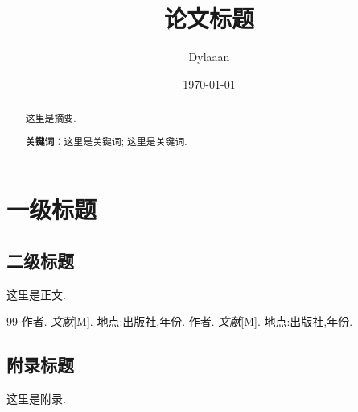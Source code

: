 \documentclass[12pt, a4paper, oneside, fontset=fandol]{ctexart}
\title{\textbf{论文标题}}
\author{Dylaaan}
\date{\today}
\begin{document}
	
	\maketitle
	
	\setcounter{page}{0}
	\maketitle
	\thispagestyle{empty}
	
	\begin{abstract}
		这里是摘要. 
		\par\textbf{关键词：}这里是关键词; 这里是关键词. 
	\end{abstract}
	
	\newpage
	\setcounter{page}{1}
	\tableofcontents
	\newpage
	\setcounter{page}{1}
	
	\section{一级标题}
	
	\subsection{二级标题}
	
	这里是正文. 
	
	\newpage
	
	\begin{thebibliography}{99}
		作者. \emph{文献}[M]. 地点:出版社,年份.
		作者. \emph{文献}[M]. 地点:出版社,年份.
	\end{thebibliography}
	
	\newpage
	
	\begin{appendices}
		\renewcommand{\thesection}{\Alph{section}}
		\section{附录标题}
		这里是附录. 
	\end{appendices}
	
\end{document}
